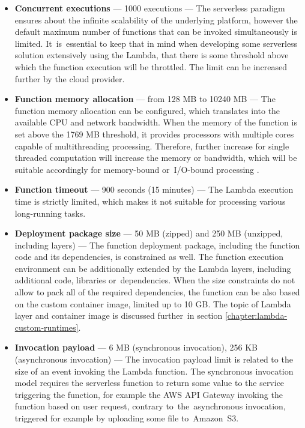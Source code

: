 \begin{itemize}
   \item \textbf{Concurrent executions} --- 1000 executions --- The serverless paradigm ensures about the infinite scalability of the underlying platform, however the default maximum number of functions that can be invoked simultaneously is limited. It~is~essential to keep that in mind when developing some serverless solution extensively using the Lambda, that there is some threshold above which the function execution will be throttled. The limit can be increased further by the cloud provider.
   \item \textbf{Function memory allocation} --- from 128 MB to 10240 MB --- The function memory allocation can be configured, which translates into the available CPU and network bandwidth. When the memory of the function is set above the 1769 MB threshold, it provides processors with multiple cores capable of multithreading processing. Therefore, further increase for single threaded computation will increase the memory or bandwidth, which will be suitable accordingly for memory-bound or~I/O-bound processing \cite{BecomeAServerlessBlackBelt}.
   \item \textbf{Function timeout} --- 900 seconds (15 minutes) --- The Lambda execution time is strictly limited, which makes it not suitable for processing various long-running tasks.
   \item \textbf{Deployment package size} --- 50 MB (zipped) and 250 MB (unzipped, including layers) --- The function deployment package, including the function code and its dependencies, is constrained as well. The function execution environment can be additionally extended by the Lambda layers, including additional code, libraries or~dependencies. When the size constraints do not allow to pack all of the required dependencies, the function can be also based on the custom container image, limited up to 10 GB. The topic of Lambda layer and container image is discussed further~in section \ref{chapter:lambda-custom-runtimes}.
   \item \textbf{Invocation payload} --- 6 MB (synchronous invocation), 256 KB (asynchronous invocation) --- The invocation payload limit is related to the size of an event invoking the Lambda function.
   The synchronous invocation model requires the serverless function to return some value to the service triggering the function, for example the AWS API Gateway invoking the function based on user request, contrary to~the~asynchronous invocation, triggered for example by uploading some file to~Amazon~S3.

\end{itemize}
